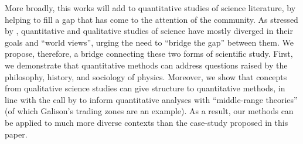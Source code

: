 \documentclass[smallextended]{svjour3}
\begin{document}





More broadly, this works will add to quantitative studies of science literature, by helping to fill a gap that has come to the attention of the community.  As stressed by \citet{Kang2020,Leydesdorff2020,Bowker2020}, quantitative and qualitative studies of science have mostly diverged in their goals and ``world views'', urging the need to ``bridge the gap'' between them. We propose, therefore, a bridge connecting these two forms of scientific study. First, we demonstrate that quantitative methods can address questions raised by the philosophy, history, and sociology of physics. Moreover, we show that concepts from qualitative 
 science studies can give structure to quantitative methods, in line with the call by \citealt{Heinze2020} to inform quantitative analyses with ``middle-range theories'' (of which Galison's trading zones are an example). As a result, our methods can be applied to much more diverse contexts than the case-study proposed in this paper.%
\end{document}

